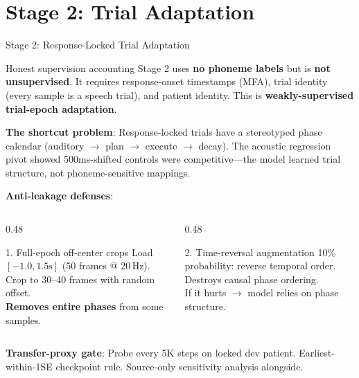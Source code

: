 \documentclass[aspectratio=169, 11pt]{beamer}
\begin{document}
\section{Stage 2: Trial Adaptation}

\begin{frame}{Stage 2: Response-Locked Trial Adaptation}

\begin{alertblock}{Honest supervision accounting}
\small
Stage 2 uses \textbf{no phoneme labels} but is \textbf{not unsupervised}. It requires response-onset timestamps (MFA), trial identity (every sample is a speech trial), and patient identity. This is \textbf{weakly-supervised trial-epoch adaptation}.
\end{alertblock}

\vspace{0.2em}
\small
\textbf{The shortcut problem}: Response-locked trials have a stereotyped phase calendar (auditory $\to$ plan $\to$ execute $\to$ decay). The acoustic regression pivot showed 500ms-shifted controls were competitive---the model learned trial structure, not phoneme-sensitive mappings.

\vspace{0.3em}
\textbf{Anti-leakage defenses}:

\begin{columns}[T]
\begin{column}{0.48\textwidth}
\begin{exampleblock}{\small 1. Full-epoch off-center crops}
\scriptsize
Load $[-1.0, 1.5\text{s}]$ (50 frames @ 20\,Hz).\\
Crop to 30--40 frames with random offset.\\
\textbf{Removes entire phases} from some samples.
\end{exampleblock}
\end{column}
\begin{column}{0.48\textwidth}
\begin{exampleblock}{\small 2. Time-reversal augmentation}
\scriptsize
10\% probability: reverse temporal order.\\
Destroys causal phase ordering.\\
If it hurts $\to$ model relies on phase structure.
\end{exampleblock}
\end{column}
\end{columns}

\vspace{0.2em}
\small\textbf{Transfer-proxy gate}: Probe every 5K steps on locked dev patient. Earliest-within-1SE checkpoint rule. Source-only sensitivity analysis alongside.
\end{frame}
\end{document}
